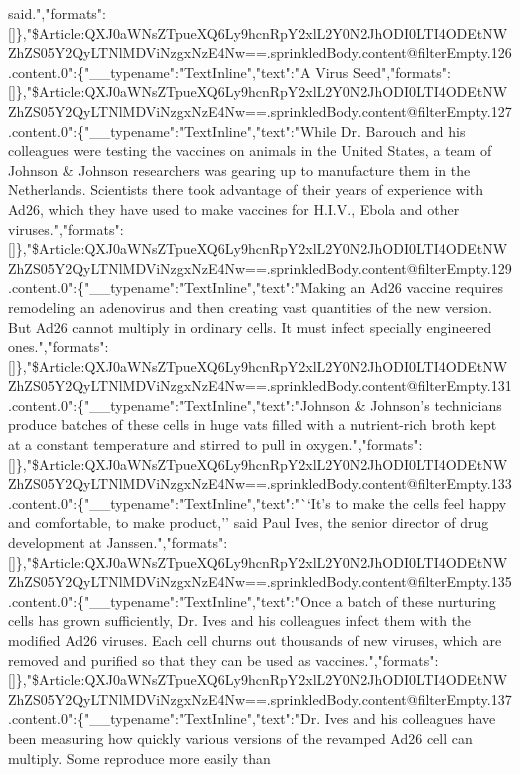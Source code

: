 said.","formats":{[}{]}\},"\$Article:QXJ0aWNsZTpueXQ6Ly9hcnRpY2xlL2Y0N2JhODI0LTI4ODEtNWZhZS05Y2QyLTNlMDViNzgxNzE4Nw==.sprinkledBody.content@filterEmpty.126.content.0":\{"\_\_typename":"TextInline","text":"A
Virus
Seed","formats":{[}{]}\},"\$Article:QXJ0aWNsZTpueXQ6Ly9hcnRpY2xlL2Y0N2JhODI0LTI4ODEtNWZhZS05Y2QyLTNlMDViNzgxNzE4Nw==.sprinkledBody.content@filterEmpty.127.content.0":\{"\_\_typename":"TextInline","text":"While
Dr. Barouch and his colleagues were testing the vaccines on animals in
the United States, a team of Johnson \& Johnson researchers was gearing
up to manufacture them in the Netherlands. Scientists there took
advantage of their years of experience with Ad26, which they have used
to make vaccines for H.I.V., Ebola and other
viruses.","formats":{[}{]}\},"\$Article:QXJ0aWNsZTpueXQ6Ly9hcnRpY2xlL2Y0N2JhODI0LTI4ODEtNWZhZS05Y2QyLTNlMDViNzgxNzE4Nw==.sprinkledBody.content@filterEmpty.129.content.0":\{"\_\_typename":"TextInline","text":"Making
an Ad26 vaccine requires remodeling an adenovirus and then creating vast
quantities of the new version. But Ad26 cannot multiply in ordinary
cells. It must infect specially engineered
ones.","formats":{[}{]}\},"\$Article:QXJ0aWNsZTpueXQ6Ly9hcnRpY2xlL2Y0N2JhODI0LTI4ODEtNWZhZS05Y2QyLTNlMDViNzgxNzE4Nw==.sprinkledBody.content@filterEmpty.131.content.0":\{"\_\_typename":"TextInline","text":"Johnson
\& Johnson's technicians produce batches of these cells in huge vats
filled with a nutrient-rich broth kept at a constant temperature and
stirred to pull in
oxygen.","formats":{[}{]}\},"\$Article:QXJ0aWNsZTpueXQ6Ly9hcnRpY2xlL2Y0N2JhODI0LTI4ODEtNWZhZS05Y2QyLTNlMDViNzgxNzE4Nw==.sprinkledBody.content@filterEmpty.133.content.0":\{"\_\_typename":"TextInline","text":"``It's
to make the cells feel happy and comfortable, to make product,'' said
Paul Ives, the senior director of drug development at
Janssen.","formats":{[}{]}\},"\$Article:QXJ0aWNsZTpueXQ6Ly9hcnRpY2xlL2Y0N2JhODI0LTI4ODEtNWZhZS05Y2QyLTNlMDViNzgxNzE4Nw==.sprinkledBody.content@filterEmpty.135.content.0":\{"\_\_typename":"TextInline","text":"Once
a batch of these nurturing cells has grown sufficiently, Dr. Ives and
his colleagues infect them with the modified Ad26 viruses. Each cell
churns out thousands of new viruses, which are removed and purified so
that they can be used as
vaccines.","formats":{[}{]}\},"\$Article:QXJ0aWNsZTpueXQ6Ly9hcnRpY2xlL2Y0N2JhODI0LTI4ODEtNWZhZS05Y2QyLTNlMDViNzgxNzE4Nw==.sprinkledBody.content@filterEmpty.137.content.0":\{"\_\_typename":"TextInline","text":"Dr.
Ives and his colleagues have been measuring how quickly various versions
of the revamped Ad26 cell can multiply. Some reproduce more easily than
